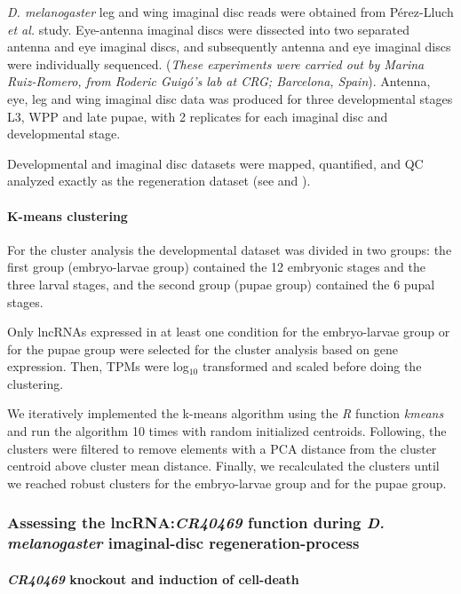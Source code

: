 \textit{D. melanogaster} leg and wing imaginal disc reads were obtained from Pérez-Lluch \textit{et al.}\autocite{perez_blister} study. Eye-antenna imaginal discs were dissected into two separated antenna and eye imaginal discs, and subsequently antenna and eye imaginal discs  were individually sequenced. (\textit{These experiments were carried out by Marina Ruiz-Romero, from Roderic Guigó’s lab at CRG; Barcelona, Spain}).  Antenna, eye, leg and wing imaginal disc data was produced for three developmental stages L3, WPP and late pupae, with 2 replicates for each imaginal disc and developmental stage. 

Developmental and imaginal disc datasets were mapped, quantified, and QC analyzed exactly as the regeneration dataset (see  and ). 

\paragraph{K-means clustering}
\label{paragraph:k-means-clustering}

For the cluster analysis the developmental dataset was divided in two groups: the first group (embryo-larvae group) contained the 12 embryonic stages and the three larval stages, and the second group (pupae group) contained the 6 pupal stages. 

Only lncRNAs expressed in at least one condition for the embryo-larvae group or for the pupae group were selected for the cluster analysis based on gene expression. Then, TPMs were log$_{10}$ transformed and scaled before doing the clustering.

We iteratively implemented the k-means algorithm using the \textit{R} function \textit{kmeans} and run the algorithm 10 times with random initialized centroids. Following, the clusters were filtered to remove elements with a PCA distance from the cluster centroid above cluster mean distance. Finally, we recalculated the clusters until we reached robust clusters for the embryo-larvae group and for the pupae group. 

\subsubsection{Assessing the lncRNA:\textit{CR40469} function during \textit{D. melanogaster} imaginal-disc regeneration-process}
\label{sec:cr40-methods}

\paragraph{\textit{CR40469} knockout and induction of cell-death}
\label{sec:generation_mutant_methods}

